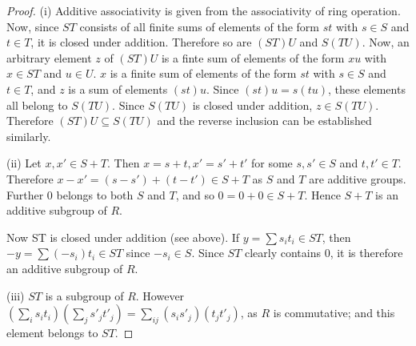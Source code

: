 \begin{proof}
  (i) Additive associativity is given from the associativity of ring operation.
  Now, since $ST$ consists of all finite sums of elements of the form $st$ with
  $s \in S$ and $t \in T$, it is closed under addition. Therefore so are $(ST)U$
  and $S(TU)$. Now, an arbitrary element $z$ of $(ST)U$ is a finte sum of elements
  of the form $xu$ with $x \in ST$ and $u \in U$. $x$ is a finite sum of elements
  of the form $st$ with $s \in S$ and $t \in T$, and $z$ is a sum of elements
  $(st)u$. Since $(st)u = s(tu)$, these elements all belong to $S(TU)$. Since
  $S(TU)$ is closed under addition, $z \in S(TU)$. Therefore $(ST)U \subseteq
  S(TU)$ and the reverse inclusion can be established similarly.

  (ii) Let $x, x' \in S + T$. Then $x = s + t, x' = s' + t'$ for some $s, s' \in S$
  and $t, t' \in T$. Therefore $x - x' = (s - s') + (t - t') \in S + T$ as $S$
  and $T$ are additive groups. Further $0$ belongs to both $S$ and $T$, and so 
  $0 = 0 + 0 \in S + T$. Hence $S + T$ is an additive subgroup of $R$.

  Now ST is closed under addition (see above). If $y = \sum s_i t_i \in ST$, then
  $-y = \sum (-s_i)t_i \in ST$ since $-s_i \in S$. Since $ST$ clearly contains $0$,
  it is therefore an additive subgroup of $R$.

  (iii) $ST$ is a subgroup of $R$. However $(\sum_i s_i t_i)(\sum_j s'_j t'_j) =
  \sum_{ij}(s_i s'_j)(t_j t'_j)$, as $R$ is commutative; and this element belongs
  to $ST$.
\end{proof}
